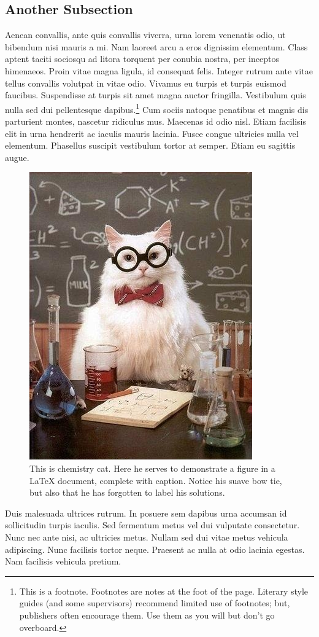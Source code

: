\subsection{Another Subsection}
Aenean convallis, ante quis convallis viverra, urna lorem venenatis odio, ut bibendum nisi mauris a mi. Nam laoreet arcu a eros dignissim elementum. Class aptent taciti sociosqu ad litora torquent per conubia nostra, per inceptos himenaeos. Proin vitae magna ligula, id consequat felis. Integer rutrum ante vitae tellus convallis volutpat in vitae odio. Vivamus eu turpis et turpis euismod faucibus. Suspendisse at turpis sit amet magna auctor fringilla. Vestibulum quis nulla sed dui pellentesque dapibus.\footnote{This is a footnote. Footnotes are notes at the foot of the page. Literary style guides (and some supervisors) recommend limited use of footnotes; but, publishers often encourage them. Use them as you will but don't go overboard.} Cum sociis natoque penatibus et magnis dis parturient montes, nascetur ridiculus mus. Maecenas id odio nisl. Etiam facilisis elit in urna hendrerit ac iaculis mauris lacinia. Fusce congue ultricies nulla vel elementum. Phasellus suscipit vestibulum tortor at semper. Etiam eu sagittis augue.\cite{bioluminescence,clayden_orgchem}


\begin{figure}
\centering
\includegraphics[height=0.45\textwidth]{figures/example.jpg}
\caption[Chemistry cat.]{This is chemistry cat. Here he serves to demonstrate a figure in a LaTeX document, complete with caption. Notice his suave bow tie, but also that he has forgotten to label his solutions.}
\end{figure}

Duis malesuada ultrices rutrum. In posuere sem dapibus urna accumsan id sollicitudin turpis iaculis. Sed fermentum metus vel dui vulputate consectetur. Nunc nec ante nisi, ac ultricies metus. Nullam sed dui vitae metus vehicula adipiscing. Nunc facilisis tortor neque. Praesent ac nulla at odio lacinia egestas. Nam facilisis vehicula pretium.

